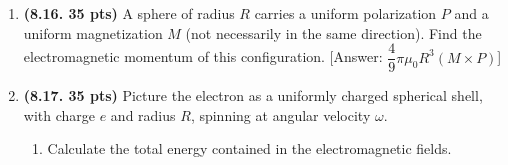 \documentclass[fleqn]{article}
\begin{document}
\begin{enumerate}


    \item \textbf{(8.16. 35 pts)} A sphere of radius $R$ carries a uniform polarization $P$ and a uniform
    magnetization $M$ (not necessarily in the same direction). Find the electromagnetic momentum of this configuration.
    [Answer: $\dfrac{4}{9} \pi \mu_0 R^3 (M \times P)$]
    



    \item \textbf{(8.17. 35 pts)} Picture the electron as a uniformly charged spherical shell, with
    charge $e$ and radius $R$, spinning at angular velocity $\omega$.
    \begin{enumerate}
      \item Calculate the total energy contained in the electromagnetic fields.
      

\end{enumerate}
\end{enumerate}
\end{document}

